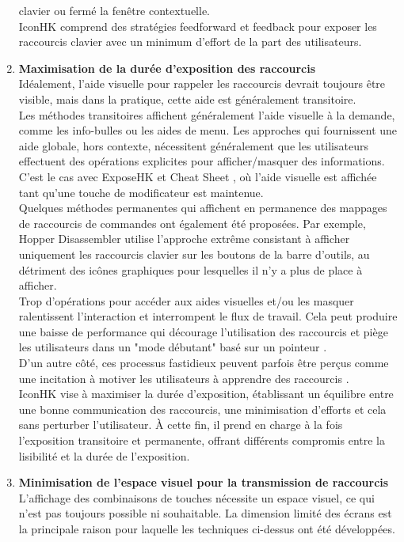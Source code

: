 \documentclass[12pt,a4paper]{article}
\newcommand\tab[1][0.65cm]{\hspace*{#1}}
\begin{document}
\begin{enumerate}
clavier ou fermé la fenêtre contextuelle.\\
\tab IconHK comprend des stratégies feedforward et feedback pour exposer les raccourcis clavier avec un minimum d'effort de la part des utilisateurs.
\item {\large \textbf{Maximisation de la durée d'exposition des raccourcis}}\\
Idéalement, l'aide visuelle pour rappeler les raccourcis devrait toujours être visible, mais dans la pratique, cette aide est généralement transitoire.\\
\tab Les méthodes transitoires affichent généralement l'aide visuelle à la demande, comme les info-bulles ou les aides de menu. Les approches qui fournissent une aide globale, hors contexte, nécessitent généralement que les utilisateurs effectuent des opérations explicites pour afficher/masquer des informations. C'est le cas avec ExposeHK \cite{7} et Cheat Sheet \cite{8}, où l'aide visuelle est affichée tant qu'une touche de modificateur est maintenue.\\
\tab Quelques méthodes permanentes qui affichent en permanence des mappages de raccourcis de commandes ont également été proposées. Par exemple, Hopper Disassembler \cite{9} utilise l'approche extrême consistant à afficher uniquement les raccourcis clavier sur les boutons de la barre d'outils, au détriment des icônes graphiques pour lesquelles il n'y a plus de place à afficher.\\
\tab Trop d'opérations pour accéder aux aides visuelles et/ou les masquer ralentissent l'interaction et interrompent le flux de travail. Cela peut produire une baisse de performance \cite{10} qui décourage
l'utilisation des raccourcis et piège les utilisateurs dans un "mode débutant" basé sur un pointeur \cite{12}.\\
\tab D'un autre côté, ces processus fastidieux peuvent parfois être perçus comme une incitation à motiver les utilisateurs à apprendre des raccourcis \cite{6}.\\
\tab IconHK vise à maximiser la durée d’exposition, établissant un équilibre entre une bonne communication des raccourcis, une minimisation d’efforts et cela sans perturber l’utilisateur. À cette fin, il prend en charge à la fois l'exposition transitoire et permanente, offrant différents
compromis entre la lisibilité et la durée de l’exposition.
\item {\large \textbf{Minimisation de l'espace visuel pour la transmission de raccourcis}}\\
L'affichage des combinaisons de touches nécessite un espace visuel, ce qui n'est pas toujours possible ni souhaitable. La dimension limité des écrans est la principale raison pour laquelle les techniques ci-dessus ont été développées.\\

\end{enumerate}
\end{document}

